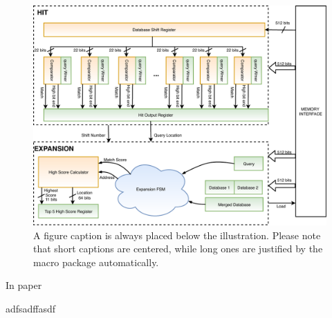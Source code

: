 \begin{figure}
\includegraphics[width=\textwidth]{Figures/BlastMachine.pdf}
\caption{A figure caption is always placed below the illustration.
Please note that short captions are centered, while long ones are
justified by the macro package automatically.} \label{fig1}
\end{figure}


In paper \cite{vipin2019}

adfsadffasdf
